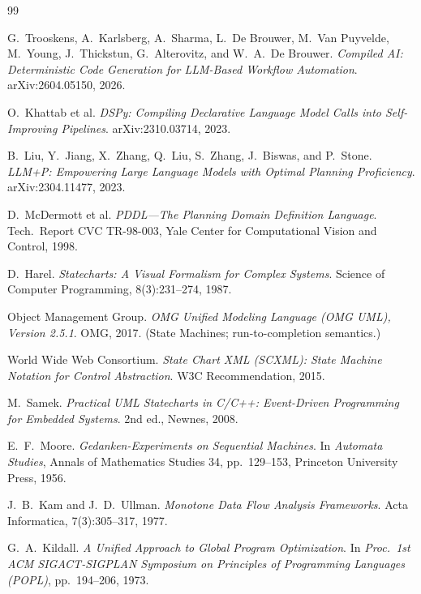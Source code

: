 \documentclass[11pt]{article}
\theoremstyle{plain}
\theoremstyle{definition}
\theoremstyle{remark}
\begin{document}
\begin{thebibliography}{99}

 G.~Trooskens, A.~Karlsberg, A.~Sharma, L.~De Brouwer,
M.~Van Puyvelde, M.~Young, J.~Thickstun, G.~Alterovitz, and W.~A.~De Brouwer.
\emph{Compiled AI: Deterministic Code Generation for LLM-Based Workflow
Automation}. arXiv:2604.05150, 2026.

 O.~Khattab et al.
\emph{DSPy: Compiling Declarative Language Model Calls into Self-Improving
Pipelines}. arXiv:2310.03714, 2023.

 B.~Liu, Y.~Jiang, X.~Zhang, Q.~Liu, S.~Zhang, J.~Biswas, and
P.~Stone. \emph{LLM+P: Empowering Large Language Models with Optimal Planning
Proficiency}. arXiv:2304.11477, 2023.

 D.~McDermott et al.
\emph{PDDL---The Planning Domain Definition Language}.
Tech.\ Report CVC TR-98-003, Yale Center for Computational Vision and Control, 1998.

 D.~Harel.
\emph{Statecharts: A Visual Formalism for Complex Systems}.
Science of Computer Programming, 8(3):231--274, 1987.

 Object Management Group.
\emph{OMG Unified Modeling Language (OMG UML), Version 2.5.1}.
OMG, 2017. (State Machines; run-to-completion semantics.)

 World Wide Web Consortium.
\emph{State Chart XML (SCXML): State Machine Notation for Control Abstraction}.
W3C Recommendation, 2015.

 M.~Samek.
\emph{Practical UML Statecharts in C/C++: Event-Driven Programming for Embedded
Systems}. 2nd ed., Newnes, 2008.

 E.~F.~Moore.
\emph{Gedanken-Experiments on Sequential Machines}.
In \emph{Automata Studies}, Annals of Mathematics Studies 34, pp.~129--153,
Princeton University Press, 1956.

 J.~B.~Kam and J.~D.~Ullman.
\emph{Monotone Data Flow Analysis Frameworks}.
Acta Informatica, 7(3):305--317, 1977.

 G.~A.~Kildall.
\emph{A Unified Approach to Global Program Optimization}.
In \emph{Proc.\ 1st ACM SIGACT-SIGPLAN Symposium on Principles of Programming
Languages (POPL)}, pp.~194--206, 1973.


\end{thebibliography}
\end{document}
